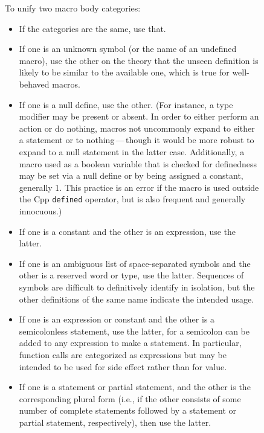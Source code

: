 \documentclass[10pt]{article}
\begin{document}
\begin{figure}
\small

\noindent
To unify two macro body categories:

\begin{itemize}\itemsep 0pt \parskip 0pt

\item If the categories are the same, use that.

\item If one is an unknown symbol (or the name of an undefined macro), use
  the other on the theory that the unseen definition is likely to be
  similar to the available one, which is true for well-behaved macros.

\item If one is a null define, use the other.  
  (For instance, a type modifier may be present or absent.  In order to
  either perform an action or do nothing, macros not uncommonly expand to
  either a statement or to nothing\,---\,though it would be more robust to
  expand to a null statement in the latter case.  Additionally, a macro
  used as a boolean variable that is checked for definedness may be set
  via a null define or by being assigned a constant, generally 1.  This
  practice is an error if the macro is used outside the Cpp {\tt defined}
  operator, but is also frequent and generally innocuous.)

\item If one is a constant and the other is an expression, use the latter.

\item If one is an ambiguous list of space-separated symbols and the other
  is a reserved word or type, use the latter.  Sequences of symbols are
  difficult to definitively identify in isolation, but the other
  definitions of the same name indicate the intended usage.

\item If one is an expression or constant and the other is a semicolonless
  statement, use the latter, for a semicolon can be added to any expression
  to make a statement.  In particular, function calls are categorized as
  expressions but may be intended to be used for side effect rather than
  for value.

\item
  If one is a statement or partial statement, and the other is the
  corresponding plural form (i.e., if the other consists of some number of
  complete statements followed by a statement or partial statement,
  respectively), then use the latter.


\end{itemize}
\end{figure}
\end{document}

